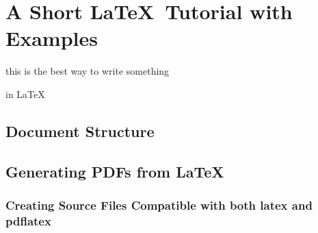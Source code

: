 

\chapter{A Short \LaTeX\ Tutorial with Examples}\label{cha:a_short_latex_tutorial_with_examples}

this is the best way
to write something

in LaTeX

\section{Document Structure}\label{sec:document_structure}

\section{Generating PDFs from \LaTeX}\label{sec:generating_pdfs_from_latex}

\subsection{Creating Source Files Compatible with both latex and pdflatex}\label{ssec:creating_source_files_compatible_with_both_latex_and_pdflatex}

 
